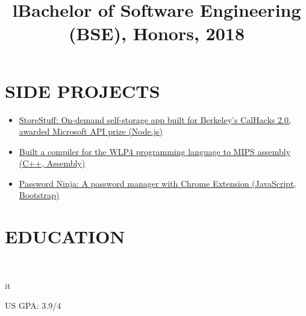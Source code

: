 \documentclass[]{res}
\begin{document}
\begin{resume}
\section{SIDE PROJECTS}
  \begin{itemize}
    \item \href{https://github.com/paulashbourne/storestuff}
      {StoreStuff: On-demand self-storage app built for Berkeley's CalHacks 2.0, awarded Microsoft API prize (Node.js)}
    \item \href{https://github.com/paulashbourne/wlp4compiler}
      {Built a compiler for the WLP4 programming language to MIPS assembly (C++, Assembly)}
    \item \href{http://password-ninja.com/}
      {Password Ninja: A password manager with Chrome Extension (JavaScript, Bootstrap)}
  \end{itemize}

\section{EDUCATION}
  \begin{format}  \\ \title{l}{it} \\ \body \end{format}
  \title{Bachelor of Software Engineering (BSE), Honors, 2018}
  \begin{position}
    US GPA: 3.9/4
  \end{position}
\end{resume}
\end{document}
